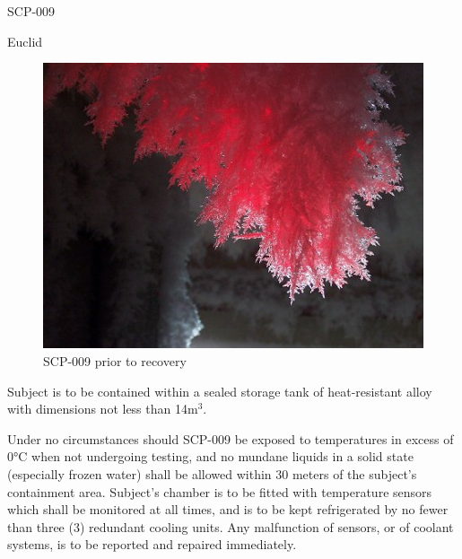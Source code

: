  SCP-009

 Euclid

\begin{figure}[h]
\begin{center}
\includegraphics[scale=1.3]{scp/009.jpg}
\linebreak SCP-009 prior to recovery
\end{center}
\end{figure}


 Subject is to be contained within a sealed storage tank of heat-resistant alloy with dimensions not less than 14m$^3$.

Under no circumstances should SCP-009 be exposed to temperatures in excess of 0°C when not undergoing testing, and no mundane liquids in a solid state (especially frozen water) shall be allowed within 30 meters of the subject's containment area. Subject's chamber is to be fitted with temperature sensors which shall be monitored at all times, and is to be kept refrigerated by no fewer than three (3) redundant cooling units. Any malfunction of sensors, or of coolant systems, is to be reported and repaired immediately.

